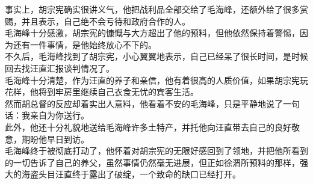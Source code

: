 \begin{multicols}{\theparacolNo}
事实上，胡宗宪确实很讲义气，他把战利品全部交给了毛海峰，还额外给了很多赏赐，并且表示，自己绝不会亏待和政府合作的人。\\

毛海峰十分感激，胡宗宪的慷慨与大方超出了他的预料，但他依然保持着警惕，因为还有一件事情，是他始终放心不下的。\\

不久后，毛海峰找到了胡宗宪，小心翼翼地表示，自己已经呆了很长时间，是时候回去找汪直汇报谈判情况了。\\

毛海峰十分清楚，作为汪直的养子和亲信，他有着很高的人质价值，如果胡宗宪玩花样，他将到牢房里继续自己衣食无忧的宾客生活。\\

然而胡总督的反应却着实出人意料，他看着不安的毛海峰，只是平静地说了一句话：我亲自为你送行。\\

此外，他还十分礼貌地送给毛海峰许多土特产，并托他向汪直带去自己的良好敬意，期盼他早日到访。\\

毛海峰终于被彻底打动了，他怀着对胡宗宪的无限好感回到了领地，并把他所看到的一切告诉了自己的养父，虽然事情仍然毫无进展，但正如徐渭所预料的那样，强大的海盗头目汪直终于露出了破绽，一个致命的缺口已经打开。\\
\ifnum{}
	\end{multicols}
\fi
\newpage
